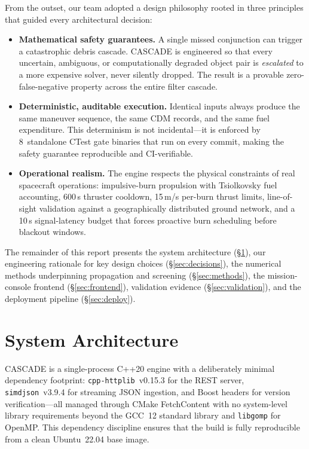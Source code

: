 \documentclass[10pt,twocolumn,letterpaper]{article}
\begin{document}
From the outset, our team adopted a design philosophy rooted in three
principles that guided every architectural decision:

\begin{itemize}[nosep,leftmargin=*]
  \item \textbf{Mathematical safety guarantees.}  A single missed
    conjunction can trigger a catastrophic debris cascade.  CASCADE is
    engineered so that every uncertain, ambiguous, or computationally
    degraded object pair is \emph{escalated} to a more expensive solver,
    never silently dropped.  The result is a provable zero-false-negative
    property across the entire filter cascade.

  \item \textbf{Deterministic, auditable execution.}  Identical inputs
    always produce the same maneuver sequence, the same CDM records, and
    the same fuel expenditure.  This determinism is not incidental---it is
    enforced by 8~standalone CTest gate binaries that run on every commit,
    making the safety guarantee reproducible and CI-verifiable.

  \item \textbf{Operational realism.}  The engine respects the physical
    constraints of real spacecraft operations: impulsive-burn propulsion
    with Tsiolkovsky fuel accounting, 600\,s thruster cooldown, 15\,m/s
    per-burn thrust limits, line-of-sight validation against a
    geographically distributed ground network, and a 10\,s signal-latency
    budget that forces proactive burn scheduling before blackout windows.
\end{itemize}

\noindent
The remainder of this report presents the system architecture
(\S\ref{sec:arch}), our engineering rationale for key design choices
(\S\ref{sec:decisions}), the numerical methods underpinning propagation
and screening (\S\ref{sec:methods}), the mission-console frontend
(\S\ref{sec:frontend}), validation evidence (\S\ref{sec:validation}),
and the deployment pipeline (\S\ref{sec:deploy}).

\section{System Architecture}\label{sec:arch}

CASCADE is a single-process C++20 engine with a deliberately minimal
dependency footprint: \texttt{cpp-httplib}~v0.15.3 for the REST server,
\texttt{simdjson}~v3.9.4 for streaming JSON ingestion, and Boost headers
for version verification---all managed through CMake FetchContent with no
system-level library requirements beyond the GCC~12 standard library and
\texttt{libgomp} for OpenMP.  This dependency discipline ensures that the
build is fully reproducible from a clean Ubuntu~22.04 base image.
\end{document}
